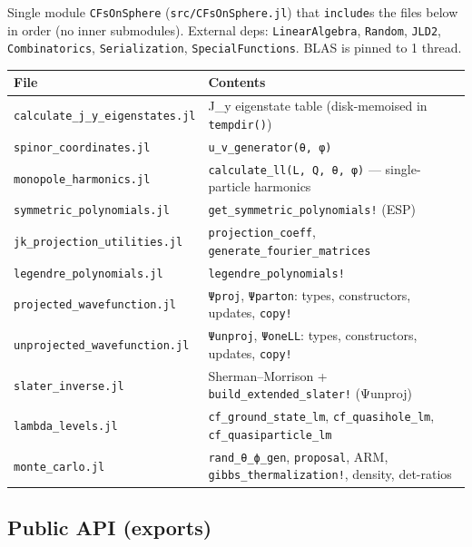 \documentclass[11pt]{article}
\newcommand{\code}[1]{\texttt{#1}}
\begin{document}
Single module \code{CFsOnSphere} (\code{src/CFsOnSphere.jl}) that \code{include}s the files below
in order (no inner submodules). External deps: \code{LinearAlgebra}, \code{Random}, \code{JLD2},
\code{Combinatorics}, \code{Serialization}, \code{SpecialFunctions}. BLAS is pinned to 1 thread.

\begin{center}\small
\begin{tabular}{@{}l p{}@{}}
\toprule
File & Contents \\
\midrule
\code{calculate\_j\_y\_eigenstates.jl} & J\_y eigenstate table (disk-memoised in \code{tempdir()}) \\
\code{spinor\_coordinates.jl} & \code{u\_v\_generator(θ, φ)} \\
\code{monopole\_harmonics.jl} & \code{calculate\_ll(L, Q, θ, φ)} --- single-particle harmonics \\
\code{symmetric\_polynomials.jl} & \code{get\_symmetric\_polynomials!} (ESP) \\
\code{jk\_projection\_utilities.jl} & \code{projection\_coeff}, \code{generate\_fourier\_matrices} \\
\code{legendre\_polynomials.jl} & \code{legendre\_polynomials!} \\
\code{projected\_wavefunction.jl} & \code{Ψproj}, \code{Ψparton}: types, constructors, updates, \code{copy!} \\
\code{unprojected\_wavefunction.jl} & \code{Ψunproj}, \code{ΨoneLL}: types, constructors, updates, \code{copy!} \\
\code{slater\_inverse.jl} & Sherman--Morrison + \code{build\_extended\_slater!} (Ψunproj) \\
\code{lambda\_levels.jl} & \code{cf\_ground\_state\_lm}, \code{cf\_quasihole\_lm}, \code{cf\_quasiparticle\_lm} \\
\code{monte\_carlo.jl} & \code{rand\_θ\_ϕ\_gen}, \code{proposal}, ARM, \code{gibbs\_thermalization!}, density, det-ratios \\
\bottomrule
\end{tabular}
\end{center}

\subsection{Public API (exports)}
\end{document}
